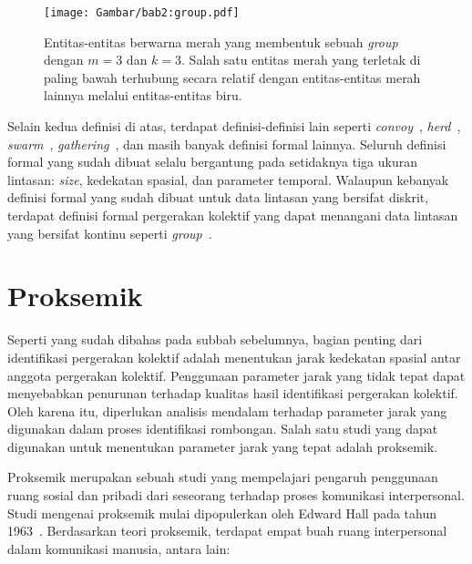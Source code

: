 \begin{itemize}
    \begin{figure}[h]
        \centering
        \captionsetup{width=0.75\textwidth}
        \texttt{[image: Gambar/bab2:group.pdf]}
        \caption[Sebuah \textit{group}]{Entitas-entitas berwarna merah yang membentuk sebuah \textit{group} dengan $m = 3$ dan $k = 3$. Salah satu entitas merah yang terletak di paling bawah terhubung secara relatif dengan entitas-entitas merah lainnya melalui entitas-entitas biru.}
        \label{bab2:group}
    \end{figure}
\end{itemize}

Selain kedua definisi di atas, terdapat definisi-definisi lain seperti \textit{convoy}~\cite{jeung:convoys}, \textit{herd}~\cite{huang:02:herd}, \textit{swarm}~\cite{li:swarm}, \textit{gathering}~\cite{zheng:02:gatherings}, dan masih banyak definisi formal lainnya. Seluruh definisi formal yang sudah dibuat selalu bergantung pada setidaknya tiga ukuran lintasan: \textit{size}, kedekatan spasial, dan parameter temporal. Walaupun kebanyak definisi formal yang sudah dibuat untuk data lintasan yang bersifat diskrit, terdapat definisi formal pergerakan kolektif yang dapat menangani data lintasan yang bersifat kontinu seperti \textit{group}~\cite{buchin:group}.

\section{Proksemik}
\label{sec:proxemic}

Seperti yang sudah dibahas pada subbab sebelumnya, bagian penting dari identifikasi pergerakan kolektif adalah menentukan jarak kedekatan spasial antar anggota pergerakan kolektif. Penggunaan parameter jarak yang tidak tepat dapat menyebabkan penurunan terhadap kualitas hasil identifikasi pergerakan kolektif. Oleh karena itu, diperlukan analisis mendalam terhadap parameter jarak yang digunakan dalam proses identifikasi rombongan. Salah satu studi yang dapat digunakan untuk menentukan parameter jarak yang tepat adalah proksemik.

Proksemik merupakan sebuah studi yang mempelajari pengaruh penggunaan ruang sosial dan pribadi dari seseorang terhadap proses komunikasi interpersonal. Studi mengenai proksemik mulai dipopulerkan oleh Edward Hall pada tahun 1963~\cite{hall:06:proxemic}. Berdasarkan teori proksemik, terdapat empat buah ruang interpersonal dalam komunikasi manusia, antara lain:

